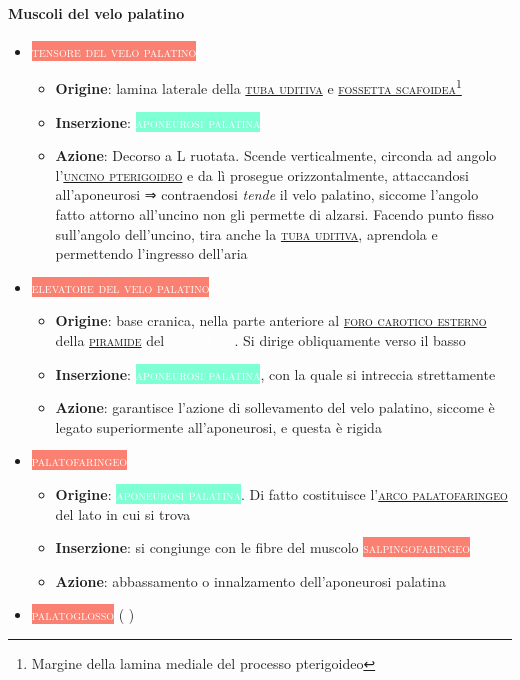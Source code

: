 \documentclass[italian,]{article}
\providecommand{\tightlist}{%
  \setlength{\itemsep}{0pt}\setlength{\parskip}{0pt}}
\newcommand{\mus}[1]{\colorbox{Salmon}{\textcolor{white}{\textsc{#1}}}}
\newcommand{\oss}[1]{\colorbox{ossa}{\textcolor{white}{\textsc{#1}}}}
\newcommand{\tol}[1]{\colorbox{Aquamarine}{\textcolor{white}{\textsc{#1}}}}
\renewcommand{\a}[1]{\underline{\textsc{#1}}}
\newcommand{\netter}[1]{ \fbox{\textsf{Netter (2014), tav. #1}} }
\begin{document}
\hypertarget{muscoli-del-velo-palatino}{%
\paragraph{Muscoli del velo palatino}\label{muscoli-del-velo-palatino}}

\begin{itemize}
\tightlist
\item
  \mus{tensore del velo palatino}~

  \begin{itemize}
  \tightlist
  \item
    \textbf{Origine}: lamina laterale della \a{tuba uditiva} e
    \a{fossetta scafoidea}\footnote{Margine della lamina mediale del
      processo pterigoideo}
  \item
    \textbf{Inserzione}: \tol{aponeurosi palatina}
  \item
    \textbf{Azione}: Decorso a L ruotata. Scende verticalmente, circonda
    ad angolo l'\a{uncino pterigoideo} e da lì prosegue orizzontalmente,
    attaccandosi all'aponeurosi ⇒ contraendosi \emph{tende} il velo
    palatino, siccome l'angolo fatto attorno all'uncino non gli permette
    di alzarsi. Facendo punto fisso sull'angolo dell'uncino, tira anche
    la \a{tuba uditiva}, aprendola e permettendo l'ingresso dell'aria
  \end{itemize}
\item
  \mus{elevatore del velo palatino}~

  \begin{itemize}
  \tightlist
  \item
    \textbf{Origine}: base cranica, nella parte anteriore al
    \a{foro carotico esterno} della \a{piramide} del \oss{temporale}. Si
    dirige obliquamente verso il basso
  \item
    \textbf{Inserzione}: \tol{aponeurosi palatina}, con la quale si
    intreccia strettamente
  \item
    \textbf{Azione}: garantisce l'azione di sollevamento del velo
    palatino, siccome è legato superiormente all'aponeurosi, e questa è
    rigida
  \end{itemize}
\item
  \mus{palatofaringeo}~

  \begin{itemize}
  \tightlist
  \item
    \textbf{Origine}: \tol{aponeurosi palatina}. Di fatto costituisce
    l'\a{arco palatofaringeo} del lato in cui si trova
  \item
    \textbf{Inserzione}: si congiunge con le fibre del muscolo
    \mus{salpingofaringeo}
  \item
    \textbf{Azione}: abbassamento o innalzamento dell'aponeurosi
    palatina
  \end{itemize}
\item
  \mus{palatoglosso} (\netter{65})~


\end{itemize}
\end{document}
